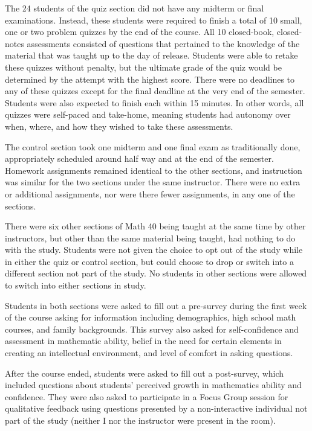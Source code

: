 The 24 students of the quiz section did not have any midterm or final examinations. Instead, these students were required to finish a total of 10 small, one or two problem quizzes by the end of the course. All 10 closed-book, closed-notes assessments consisted of questions that pertained to the knowledge of the material that was taught up to the day of release. Students were able to retake these quizzes without penalty, but the ultimate grade of the quiz would be determined by the attempt with the highest score. There were no deadlines to any of these quizzes except for the final deadline at the very end of the semester. Students were also expected to finish each within 15 minutes. In other words, all quizzes were self-paced and take-home, meaning students had autonomy over when, where, and how they wished to take these assessments.

The control section took one midterm and one final exam as traditionally done, appropriately scheduled around half way and at the end of the semester. Homework assignments remained identical to the other sections, and instruction was similar for the two sections under the same instructor. There were no extra or additional assignments, nor were there fewer assignments, in any one of the sections.

There were six other sections of Math 40 being taught at the same time by other instructors, but other than the same material being taught, had nothing to do with the study. Students were not given the choice to opt out of the study while in either the quiz or control section, but could choose to drop or switch into a different section not part of the study. No students in other sections were allowed to switch into either sections in study.

Students in both sections were asked to fill out a pre-survey during the first week of the course asking for information including demographics, high school math courses, and family backgrounds. This survey also asked for self-confidence and assessment in mathematic ability, belief in the need for certain elements in creating an intellectual environment, and level of comfort in asking questions.

After the course ended, students were asked to fill out a post-survey, which included questions about students' perceived growth in mathematics ability and confidence. They were also asked to participate in a Focus Group session for qualitative feedback using questions presented by a non-interactive individual not part of the study (neither I nor the instructor were present in the room).

